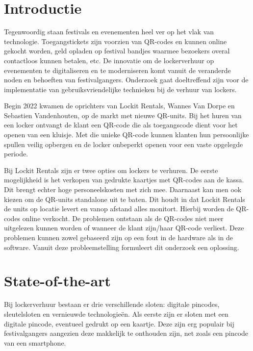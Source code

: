 \documentclass[dutch,dit,thesis]{hogentreport}
\begin{document}
%

\section{Introductie}%
\label{sec:introductie}

Tegenwoordig staan festivals en evenementen heel ver op het vlak van technologie. Toegangstickets zijn voorzien van QR-codes en kunnen online gekocht worden, geld opladen op festival bandjes waarmee bezoekers overal contactloos kunnen betalen, etc. De innovatie om de lockerverhuur op evenementen te digitaliseren en te moderniseren komt vanuit de veranderde noden en behoeften van festivalgangers. Onderzoek gaat doeltreffend zijn voor de implementatie van gebruiksvriendelijke technieken bij de verhuur van lockers.

Begin 2022 kwamen de oprichters van Lockit Rentals, Wannes Van Dorpe en Sebastien Vandenhouten, op de markt met nieuwe QR-units. Bij het huren van een locker ontvangt de klant een QR-code die als toegangscode dient voor het openen van een kluisje. Met die unieke QR-code kunnen klanten hun persoonlijke spullen veilig opbergen en de locker onbeperkt openen voor een vaste opgelegde periode. 

Bij Lockit Rentals zijn er twee opties om lockers te verhuren. De eerste mogelijkheid is het verkopen van gedrukte kaartjes met QR-codes aan de kassa. Dit brengt echter hoge personeelskosten met zich mee. Daarnaast kan men ook kiezen om de QR-units standalone uit te baten. Dit houdt in dat Lockit Rentals de units op locatie levert en vanop afstand alles monitort. Hierbij worden de QR-codes online verkocht. De problemen ontstaan als de QR-codes niet meer uitgelezen kunnen worden of wanneer de klant zijn/haar QR-code verliest. Deze problemen kunnen zowel gebaseerd zijn op een fout in de hardware als in de software. Vanuit deze probleemstelling formuleert dit onderzoek een oplossing.  



\section{State-of-the-art}%
\label{sec:state-of-the-art}

Bij lockerverhuur bestaan er drie verschillende sloten: digitale pincodes, sleutelsloten en vernieuwde technologieën. Als eerste zijn er sloten met een digitale pincode, eventueel gedrukt op een kaartje. Deze zijn erg populair bij festivalgangers aangezien deze makkelijk te onthouden zijn, net zoals een pincode van een smartphone.
\end{document}
